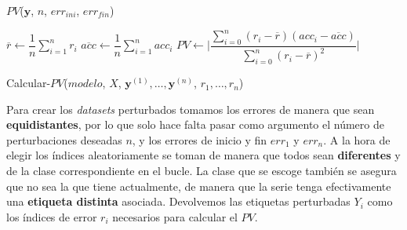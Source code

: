 \begin{algorithm}[htbp]
\SetAlgoLined
 \caption{$PV$($\textbf{y}$, $n$, $err_{ini}$, $err_{fin}$)}
 \label{alg:create_pv}
\end{algorithm}

\begin{algorithm}[htbp]
\SetAlgoLined
 $\overline{r} \gets \dfrac{1}{n} \sum \limits_{i = 1}^{n} r_i$\;
 $\overline{acc} \gets \dfrac{1}{n} \sum \limits_{i = 1}^{n} acc_i$\;
 $PV \gets \Bigg|\dfrac{\sum \limits^n_{i = 0} (r_i - \overline{r})(acc_i - \overline{acc})}{\sum \limits^n_{i = 0}(r_i - \overline{r})^2}\Bigg|$\;
 \caption{Calcular-$PV$($modelo$, $X$, $\textbf{y}^{(1)}, \ldots, \textbf{y}^{(n)}$, $r_1, \ldots, r_n$)}
 \label{alg:calc_pv}
\end{algorithm}

Para crear los \emph{datasets} perturbados tomamos los errores de manera que sean \textbf{equidistantes}, por lo que solo hace falta pasar como argumento el número de perturbaciones deseadas $n$, y los errores de inicio y fin $err_{1}$ y $err_{n}$. A la hora de elegir los índices aleatoriamente se toman de manera que todos sean \textbf{diferentes} y de la clase correspondiente en el bucle. La clase que se escoge también se asegura que no sea la que tiene actualmente, de manera que la serie tenga efectivamente una \textbf{etiqueta distinta} asociada. Devolvemos las etiquetas perturbadas $Y_i$ como los índices de error $r_i$ necesarios para calcular el $PV$.

